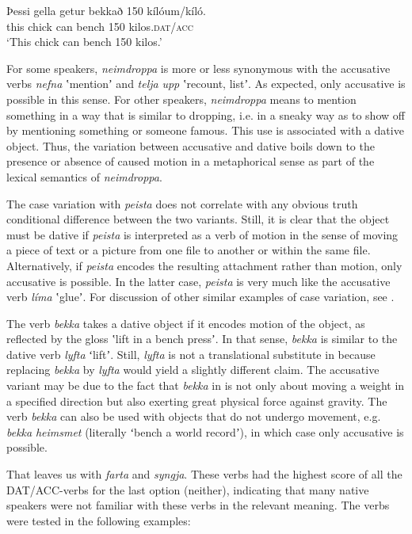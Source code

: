\documentclass[output=paper,modfonts,nonflat,colorlinks,citecolor=brown]{langsci/langscibook}
\begin{document}
{\ex\label{ex:jonsson:7e}
\gll   Þessi  gella  getur  bekkað  150  kílóum/kíló.\\
 this  chick  can  bench  150  kilos.\textsc{dat/acc}\\
\glt `This chick can bench 150 kilos.'
\z
\z


For some speakers, \textit{neimdroppa} is more or less synonymous with the accusative verbs \textit{nefna} ʽmentionʼ and \textit{telja} \textit{upp} ʽrecount, listʼ. As expected, only accusative is possible in this sense. For other speakers,  \textit{neimdroppa} means to mention something in a way that is similar to dropping, i.e. in a sneaky way as to show off by mentioning something or someone famous. This use is associated with a dative object. Thus, the variation between accusative and dative boils down to the presence or absence of caused motion in a metaphorical sense as part of the lexical semantics of \textit{neimdroppa}.

The case variation with \textit{peista} does not correlate with any obvious truth conditional difference between the two variants. Still, it is clear that the object must be dative if \textit{peista} is interpreted as a verb of motion in the sense of moving a piece of text or a picture from one file to another or within the same file. Alternatively, if \textit{peista} encodes the resulting attachment rather than motion, only accusative is possible. In the latter case, \textit{peista} is very much like the accusative verb \textit{líma} ʽglueʼ. For discussion of other similar examples of case variation, see \citet{Jónsson2013a}.

The verb \textit{bekka} takes a dative object if it encodes motion of the object, as reflected by the gloss ʽlift in a bench pressʼ. In that sense, \textit{bekka} is similar to the dative verb \textit{lyfta} ʻliftʼ. Still, \textit{lyfta} is not a translational substitute in  because replacing \textit{bekka} by \textit{lyfta} would yield a slightly different claim. The accusative variant may be due to the fact that \textit{bekka} in  is not only about moving a weight in a specified direction but also exerting great physical force against gravity. The verb \textit{bekka} can also be used with objects that do not undergo movement, e.g. \textit{bekka} \textit{heimsmet} (literally ʻbench a world recordʼ), in which case only accusative is possible. 

That leaves us with \textit{farta} and \textit{syngja}. These verbs had the highest score of all the DAT/ACC-verbs for the last option (neither), indicating that many native speakers were not familiar with these verbs in the relevant meaning. The verbs were tested in the following examples: 


}
\end{document}
